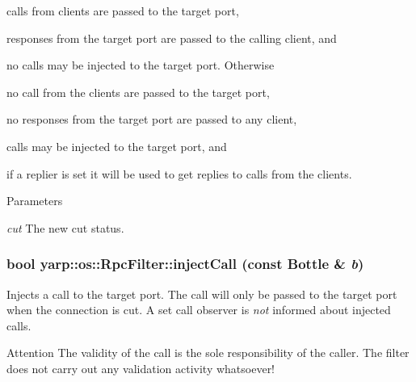 \begin{DoxyItemize}
\item calls from clients are passed to the target port,
\item responses from the target port are passed to the calling client, and
\item no calls may be injected to the target port. Otherwise
\item no call from the clients are passed to the target port,
\item no responses from the target port are passed to any client,
\item calls may be injected to the target port, and
\item if a replier is set it will be used to get replies to calls from the clients. 
\begin{DoxyParams}{Parameters}
\item[{\em cut}]The new cut status. \end{DoxyParams}

\end{DoxyItemize}\hypertarget{classyarp_1_1os_1_1_rpc_filter_a2c5878b2acec1306a960e5baf58b5521}{
\subsubsection[{injectCall}]{\setlength{\rightskip}{0pt plus 5cm}bool yarp::os::RpcFilter::injectCall (const Bottle \& {\em b})}}
\label{classyarp_1_1os_1_1_rpc_filter_a2c5878b2acec1306a960e5baf58b5521}
Injects a call to the target port. The call will only be passed to the target port when the connection is cut. A set call observer is {\itshape not\/} informed about injected calls.

\begin{DoxyAttention}{Attention}
The validity of the call is the sole responsibility of the caller. The filter does not carry out any validation activity whatsoever! 
\end{DoxyAttention}

